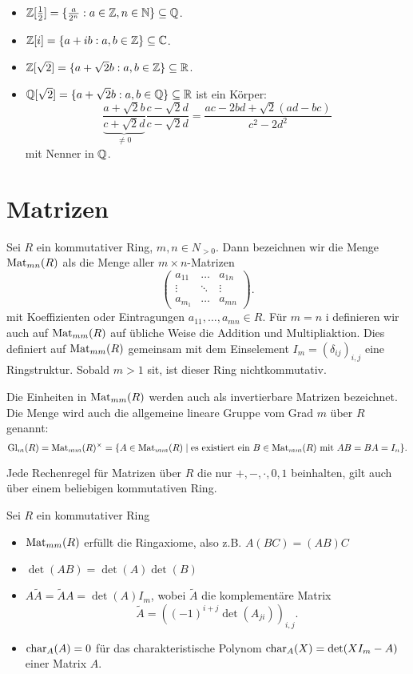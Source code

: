 \begin{eg}
	\begin{itemize}
		\item $\mathbb{Z}[\frac{1}{2}] = \{\frac{a}{2^{n}} : a \in \mathbb{Z}, n \in \mathbb{N}\} \subseteq \mathbb{Q}$.
		\item $\mathbb{Z}[i] = \{a+ib : a,b \in \mathbb{Z}\} \subseteq \mathbb{C}$. 
		\item $\mathbb{Z}[\sqrt{2}] = \{a + \sqrt{2} b: a,b \in \mathbb{Z}\} \subseteq \mathbb{R}$.
		\item $\mathbb{Q}[\sqrt{2}] = \{a+\sqrt{2} b: a,b \in \mathbb{Q}\} \subseteq \mathbb{R}$
			ist ein Körper:
			\[
			\frac{a + \sqrt{2} b}{\underbrace{c + \sqrt{2} d}_{\neq 0}} \frac{c- \sqrt{2} d}{c - \sqrt{2} d}
			= \frac{ac - 2bd + \sqrt{2} (ad-bc)}{c^2 - 2 d^2}
			\] 
			mit Nenner in $\mathbb{Q}$.
	\end{itemize}
\end{eg}

\section{Matrizen}
Sei $R$ ein kommutativer Ring, $m,n \in N_{> 0}$.
Dann bezeichnen wir die Menge $\operatorname{Mat}_{mn}(R)$ als die Menge aller $m \times n$-Matrizen
\[
\begin{pmatrix} 
a_{11} &\ldots &a_{1n}\\
\vdots &\ddots &\vdots\\
a_{m_1} &\ldots &a_{mn}
\end{pmatrix} 
.\] 
mit Koeffizienten oder Eintragungen $a_{11},\ldots,a_{mn} \in R$.
Für $m=n$ i definieren wir auch auf $\operatorname{Mat}_{mm}(R)$ auf übliche Weise die Addition und Multipliaktion.
Dies definiert auf $\operatorname{Mat}_{mm}(R)$ gemeinsam mit dem Einselement $I_{m} = (\delta_{ij})_{i,j}$ eine Ringstruktur.
Sobald $m > 1$ sit, ist dieser Ring nichtkommutativ.

Die Einheiten in $\operatorname{Mat}_{mm}(R)$ werden auch als invertierbare Matrizen bezeichnet.
Die Menge wird auch die allgemeine lineare Gruppe vom Grad $m$ über $R$ genannt:
\[
	\operatorname{Gl}_{m}(R) = \operatorname{Mat}_{mm}(R)^{\times} = \{A \in \operatorname{Mat}_{mm}(R) \mid \text{es existiert ein } B \in \operatorname{Mat}_{mm}(R) \text{ mit } AB = BA = I_{n}\}   
.\] 


\begin{proposition}[Meta]
	Jede Rechenregel für Matrizen über $R$ die nur $+,-,\cdot,0,1$ beinhalten, gilt auch über einem beliebigen kommutativen Ring.
\end{proposition}

\begin{proposition}
	Sei $R$ ein kommutativer Ring
	\begin{itemize}
		\item $\operatorname{Mat}_{mm}(R)$ erfüllt die Ringaxiome, also z.B. $A(BC) = (AB)C$
		\item $\det(AB) = \det(A) \det(B)$
		\item  $A \widetilde{A} = \widetilde{A} A = \det(A) I_{m}$, wobei $\widetilde{A}$ die komplementäre Matrix
			\[
				\widetilde{A} = ((-1)^{i+j} \det(A_{ji}))_{i,j}
			.\] 
		\item $\operatorname{char}_{A}(A) = 0$ für das charakteristische Polynom $\operatorname{char}_{A}(X) = \det(X I_{m} - A)$ einer Matrix $A$.
	\end{itemize}
\end{proposition}

